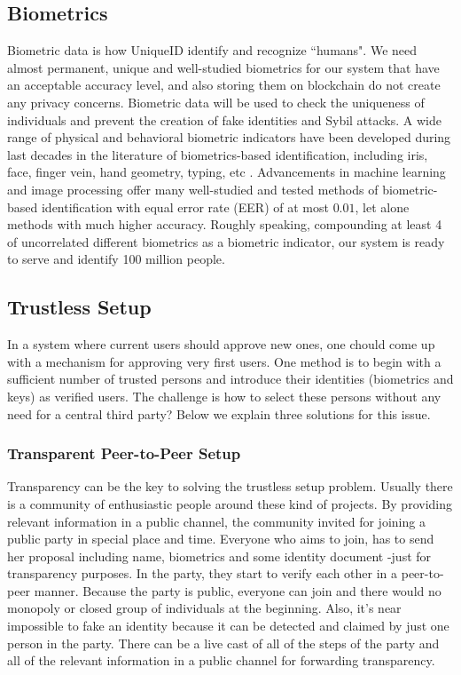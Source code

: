 \documentclass[conference]{IEEEtran}
\begin{document}
\subsection{Biometrics}
Biometric data is how UniqueID identify and recognize ``humans". We need almost permanent, unique and well-studied biometrics for our system that have an acceptable accuracy level, and also storing them on blockchain do not create any privacy concerns.
Biometric data will be used to check the uniqueness of individuals and prevent the creation of fake identities and Sybil attacks. A wide range of physical and behavioral biometric indicators have been developed during last decades in the literature of biometrics-based identification, including iris, face, finger vein, hand geometry, typing, etc \cite{intro-biometic}. Advancements in machine learning and image processing offer many well-studied and tested methods of biometric-based identification with equal error rate (EER) of at most $0.01$, let alone methods with much higher accuracy. Roughly speaking, compounding at least 4 of uncorrelated different biometrics as a biometric indicator, our system is ready to serve and identify 100 million people.

\subsection{Trustless Setup}
In a system where current users should approve new ones, one chould come up with a mechanism for approving very first users. One method is to begin with a sufficient number of trusted persons and introduce their identities (biometrics and keys) as verified users. The challenge is how to select these persons without any need for a central third party? Below we explain three solutions for this issue.

\subsubsection*{Transparent Peer-to-Peer Setup} 
Transparency can be the key to solving the trustless setup problem. Usually there is a community of enthusiastic people around these kind of projects. By providing relevant information in a public channel, the community invited for joining a public party in special place and time. Everyone who aims to join, has to send her proposal including name, biometrics and some identity document -just for transparency purposes. In the party, they start to verify each other in a peer-to-peer manner. Because the party is public, everyone can join and there would no monopoly or closed group of individuals at the beginning. Also, it's near impossible to fake an identity because it can be detected and claimed by just one person in the party. There can be a live cast of all of the steps of the party and  all of the relevant information in a public channel for forwarding transparency.
\end{document}

